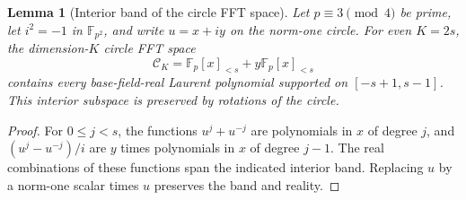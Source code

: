 \documentclass[11pt,letterpaper]{article}
\newtheorem{lemma}[theorem]{Lemma}
\theoremstyle{definition}
\theoremstyle{remark}
\begin{document}
\begin{lemma}[Interior band of the circle FFT space]\label{rl:band}
Let $p\equiv3\pmod4$ be prime, let $i^2=-1$ in $\mathbb F_{p^2}$, and write
$u=x+iy$ on the norm-one circle. For even $K=2s$, the dimension-$K$ circle FFT
space
\[
 \mathcal C_K=\mathbb F_p[x]_{<s}+y\mathbb F_p[x]_{<s}
\]
contains every base-field-real Laurent polynomial supported on
$[-s+1,s-1]$. This interior subspace is preserved by rotations of the circle.
\end{lemma}
\begin{proof}
For $0\le j<s$, the functions $u^j+u^{-j}$ are polynomials in $x$ of degree
$j$, and $(u^j-u^{-j})/i$ are $y$ times polynomials in $x$ of degree $j-1$.
The real combinations of these functions span the indicated interior band.
Replacing $u$ by a norm-one scalar times $u$ preserves the band and reality.
\end{proof}
\end{document}
